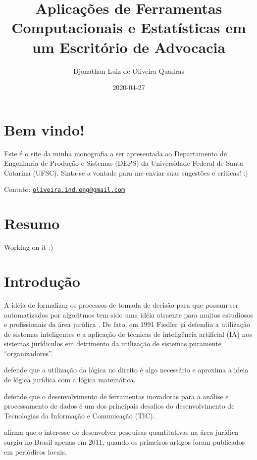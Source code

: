 \documentclass[
]{book}
\title{Aplicações de Ferramentas Computacionais e Estatísticas em um Escritório de Advocacia}
\author{Djonathan Luiz de Oliveira Quadras}
\date{2020-04-27}
\begin{document}
\maketitle

{
\setcounter{tocdepth}{1}
\tableofcontents
}
\hypertarget{bem-vindo}{%
\chapter*{Bem vindo!}\label{bem-vindo}}

Este é o site da minha monografia a ser apresentada ao Departamento de Engenharia de Produção e Sistemas (DEPS) da Universidade Federal de Santa Catarina (UFSC). Sinta-se a vontade para me enviar suas sugestões e críticas! :)

Contato: \href{mailto:oliveira.ind.eng@gmail.com}{\nolinkurl{oliveira.ind.eng@gmail.com}}

\hypertarget{resumo}{%
\chapter*{Resumo}\label{resumo}}

Working on it :)

\hypertarget{introduuxe7uxe3o}{%
\chapter{Introdução}\label{introduuxe7uxe3o}}

A idéia de formalizar os processos de tomada de decisão para que possam ser automatizados por algoritmos tem sido uma idéia atraente para muitos estudiosos e profissionais da área jurídica \citep{Waltl2018, liu2004}. De fato, em 1991 Fiedler já defendia a utilização de sistemas inteligentes e a aplicação de técnicas de inteligência artificial (IA) nos sistemas jurídiculos em detrimento da utilização de sistemas puramente ``organizadores''.

\citet{Fiedler1991} defende que a utilização da lógica no direito é algo necessário e aproxima a ideia de lógica jurídica com a lógica matemática.

\citet{Guarino2019} defende que o desenvolvimento de ferramentas inovadoras para a análise e processamento de dados é um dos principais desafios do desenvolvimento de Tecnologias da Informação e Comunicação (TIC).

\citet{Colombo2017} afirma que o interesse de desenvolver pesquisas quantitativas na área jurídica surgiu no Brasil apenas em 2011, quando os primeiros artigos foram publicados em periódicos locais.
\end{document}
